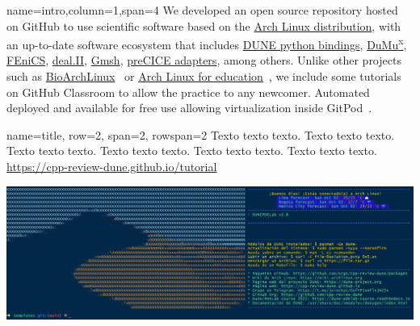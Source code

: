 \documentclass[
	paper=a0,
	style=ruled, %
	]{bfhsciposter}
\begin{document}
\begin{tcbposter}[
		poster={
				columns=4,
				rows=7,
				spacing=1cm,
			},]

	\begin{posterboxenv}[,BFH-abstract,title=Abstract]{name=intro,column=1,span=4}
		We developed an open source repository hosted on GitHub to use
		scientific software based on the \href{https://archlinux.org}{Arch Linux distribution},
		with an up-to-date software ecosystem that includes
		\href{https://dune-project.org/doc/gettingstarted}{DUNE python bindings},
		\href{https://dumux.org}{DuMu\textsuperscript{x}},
		\href{https://fenicsproject.org}{FEniCS},
		\href{https://www.dealii.org}{deal.II},
		\href{https://gmsh.info}{Gmsh},
		\href{https://precice.org/adapters-overview.html}{preCICE adapters},
		among others.
		Unlike other projects such as
		\href{https://github.com/BioArchLinux}{BioArchLinux}~\cite{bioarchlinux_2022}
		or \href{https://github.com/arch4edu}{Arch Linux for education}~\cite{arch4edu2022},
		we include some tutorials on GitHub Classroom to allow the practice
		to any newcomer.
		Automated deployed and available for free use allowing virtualization inside
		GitPod~\cite{gitpod_2022}.
	\end{posterboxenv}

	\begin{posterboxenv}[BFH-framed, title=C++ Review DUNE]{name=title, row=2, span=2, rowspan=2}
		Texto texto texto. Texto texto texto. Texto texto texto. Texto texto texto. Texto texto texto. Texto texto texto.
		\url{https://cpp-review-dune.github.io/tutorial}

		\includegraphics[width=\linewidth]{splash}
	\end{posterboxenv}


\end{tcbposter}
\end{document}
